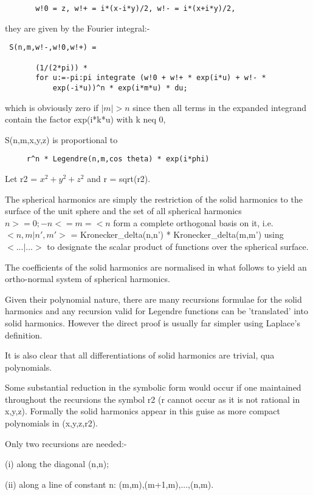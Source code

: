 \begin{verbatim}
       w!0 = z, w!+ = i*(x-i*y)/2, w!- = i*(x+i*y)/2,
\end{verbatim}

they are given by the Fourier integral:-

\begin{verbatim}
 S(n,m,w!-,w!0,w!+) =

       (1/(2*pi)) *
       for u:=-pi:pi integrate (w!0 + w!+ * exp(i*u) + w!- *
           exp(-i*u))^n * exp(i*m*u) * du;
\end{verbatim}

which is obviously zero if $|m| > n$ since then all terms in the
expanded integrand contain the factor exp(i*k*u) with k neq 0,

S(n,m,x,y,z) is proportional to
\begin{verbatim}
     r^n * Legendre(n,m,cos theta) * exp(i*phi)
\end{verbatim}

Let r2 = $x^2 + y^2 + z^2$ and r = sqrt(r2).

The spherical harmonics are simply the restriction of the solid
harmonics to the surface of the unit sphere and the set of all
spherical harmonics {$n >=0; -n <= m =< n$} form a complete orthogonal
basis on it, i.e. $<n,m|n',m'>$ = Kronecker\_delta(n,n') *
Kronecker\_delta(m,m') using
$<...|...>$ to designate the scalar product
of functions over the spherical surface.

The coefficients of the solid harmonics are normalised in what
follows to yield an ortho-normal system of spherical harmonics.

Given their polynomial nature, there are many recursions formulae
for the solid harmonics and any recursion valid for Legendre functions
can be 'translated' into solid harmonics. However the direct proof is
usually far simpler using Laplace's definition.

It is also clear that all differentiations of solid harmonics are
trivial, qua polynomials.

Some substantial reduction in the symbolic form would occur if one
maintained throughout the recursions the symbol r2 (r cannot occur
as it is not rational in x,y,z). Formally the solid harmonics appear
in this guise as more compact polynomials in (x,y,z,r2).

Only two recursions are needed:-

(i) along the diagonal (n,n);

(ii) along a line of constant n: (m,m),(m+1,m),...,(n,m).

